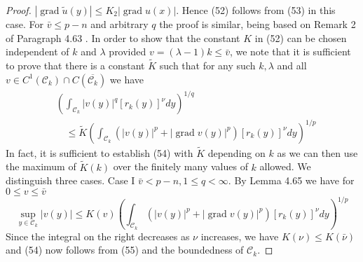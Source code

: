 \begin{proof}
  $|\operatorname{grad} \tilde{u}(y)| \leq K_2|\operatorname{grad} u(x)|$.
  Hence (52) follows from (53) in this case. For $\bar{v} \leq p-n$ and arbitrary $q$ the proof is similar, being based on Remark 2 of Paragraph 4.63 .
  In order to show that the constant $K$ in (52) can be chosen independent of $k$ and $\lambda$ provided $v=(\lambda-1) k \leq \bar{v}$, we note that it is sufficient to prove that there is a constant $\tilde{K}$ such that for any such $k, \lambda$ and all $v \in C^1\left(\mathcal{C}_k\right) \cap C\left(\overline{\mathcal{C}_k}\right)$ we have
  \[
  \begin{aligned}
  & \left(\int_{\mathcal{C}_k}|v(y)|^q\left[r_k(y)\right]^\nu d y\right)^{1 / q} \\
  & \quad \leq \tilde{K}\left(\int_{\mathcal{C}_k}\left(|v(y)|^p+|\operatorname{grad} v(y)|^p\right)\left[r_k(y)\right]^\nu d y\right)^{1 / p}
  \end{aligned}
  \]
  In fact, it is sufficient to establish (54) with $\tilde{K}$ depending on $k$ as we can then use the maximum of $\tilde{K}(k)$ over the finitely many values of $k$ allowed. We distinguish three cases.
  Case I $\bar{v}<p-n, 1 \leq q<\infty$. By Lemma 4.65 we have for $0 \leq v \leq \bar{v}$
  \[
  \sup _{y \in \mathcal{C}_k}|v(y)| \leq K(v)\left(\int_{\mathcal{C}_k}\left(|v(y)|^p+|\operatorname{grad} v(y)|^p\right)\left[r_k(y)\right]^\nu d y\right)^{1 / p}
  \]
  Since the integral on the right decreases as $\nu$ increases, we have $K(\nu) \leq K(\bar{\nu})$ and (54) now follows from (55) and the boundedness of $\mathcal{C}_k$.
  

\end{proof}
